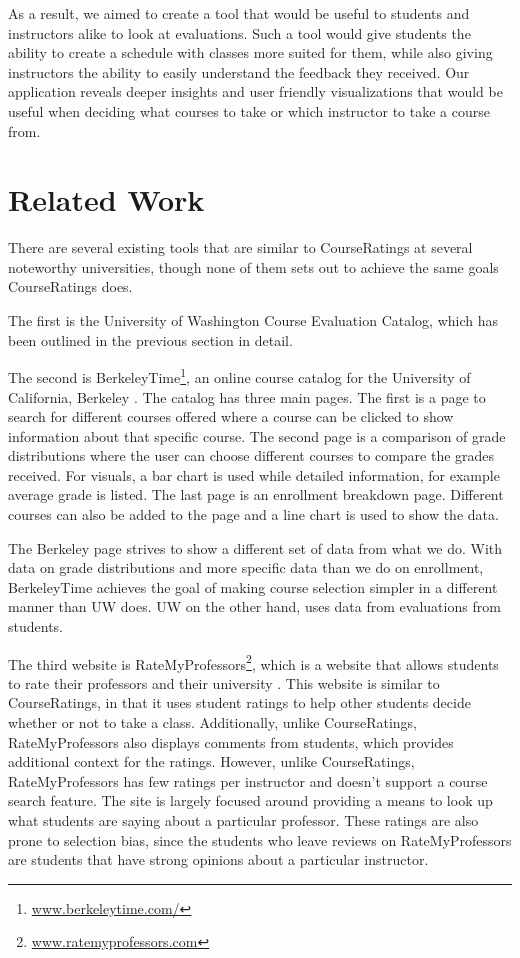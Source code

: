 \documentclass{chi2009}
\begin{document}
As a result, we aimed to create a tool that would be useful to students and instructors alike to look at evaluations.  Such a tool would give students the ability to create a schedule with classes more suited for them, while also giving instructors the ability to easily understand the feedback they received. Our application reveals deeper insights and user friendly visualizations that would be useful when deciding what courses to take or which instructor to take a course from.

\section{Related Work}

There are several existing tools that are similar to CourseRatings at several noteworthy universities, though none of them sets out to achieve the same goals CourseRatings does.

The first is the University of Washington Course Evaluation Catalog, which has been outlined in the previous section in detail.

The second is BerkeleyTime\footnote{\href{www.berkeleytime.com/}{www.berkeleytime.com/}}, an online course catalog for the University of California, Berkeley \cite{berkeleytime}. The catalog has three main pages.  The first is a page to search for different courses offered where a course can be clicked to show information about that specific course. The second page is a comparison of grade distributions where the user can choose different courses to compare the grades received. For visuals, a bar chart is used while detailed information, for example average grade is listed. The last page is an enrollment breakdown page.  Different courses can also be added to the page and a line chart is used to show the data.

The Berkeley page strives to show a different set of data from what we do.  With data on grade distributions and more specific data than we do on enrollment, BerkeleyTime achieves the goal of making course selection simpler in a different manner than UW does. UW on the other hand, uses data from evaluations from students.

The third website is RateMyProfessors\footnote{\href{www.ratemyprofessors.com}{www.ratemyprofessors.com}}, which is a website that allows students to rate their professors and their university \cite{ratemyprofessors}. This website is similar to CourseRatings, in that it uses student ratings to help other students decide whether or not to take a class. Additionally, unlike CourseRatings, RateMyProfessors also displays comments from students, which provides additional context for the ratings. However, unlike CourseRatings, RateMyProfessors has few ratings per instructor and doesn't support a course search feature. The site is largely focused around providing a means to look up what students are saying about a particular professor. These ratings are also prone to selection bias, since the students who leave reviews on RateMyProfessors are students that have strong opinions about a particular instructor.
\end{document}
